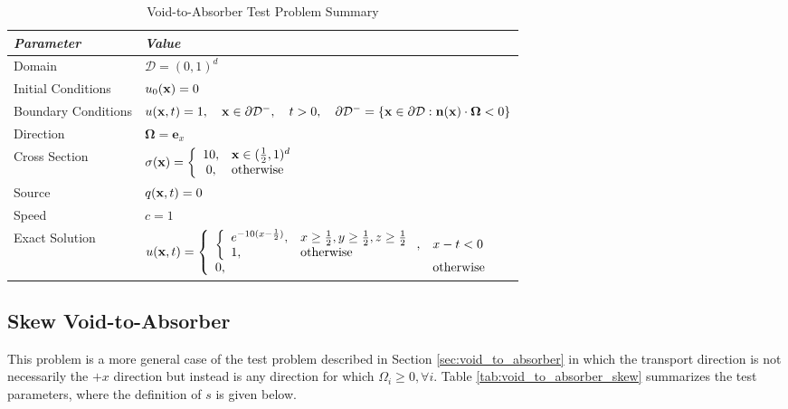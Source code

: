 \begin{table}[h]\caption{Void-to-Absorber Test Problem Summary}
\label{tab:void_to_absorber}
\centering
\begin{tabular}{l l}\toprule
\emph{Parameter} & \emph{Value}\\\midrule
Domain & $\mathcal{D} = (0,1)^d$\\
Initial Conditions & $u_0(\mathbf{x})=0$\\
Boundary Conditions & $u(\mathbf{x},t)=1,\quad \mathbf{x}\in\partial\mathcal{D}^-,\quad t>0,
   \quad\partial\mathcal{D}^-=\{\mathbf{x}\in\partial\mathcal{D}:\mathbf{n}(\mathbf{x})
   \cdot\mathbf{\Omega}<0\}$\\
Direction & $\mathbf{\Omega} = \mathbf{e}_x$\\
Cross Section & $\sigma(\mathbf{x})=\left\{\begin{array}{c l}
   10, & \mathbf{x}\in(\frac{1}{2},1)^d\\
   0,  & \mbox{otherwise}\end{array}\right.$\\
Source & $q(\mathbf{x},t)=0$\\
Speed & $c=1$\\
Exact Solution & $u(\mathbf{x},t)=\left\{\begin{array}{l l}
   \left\{\begin{array}{l l}
      e^{-10(x-\frac{1}{2})}, & x\ge\frac{1}{2}, y\ge\frac{1}{2}, z\ge\frac{1}{2}\\
      1,                      & \mbox{otherwise}
   \end{array}\right., & x-t<0\\
   0, & \mbox{otherwise}
   \end{array}\right.$ \\
\bottomrule\end{tabular}
\end{table}
\subsection{Skew Void-to-Absorber}\label{sec:skew_void_to_absorber}
This problem is a more general case of the test problem described in
Section \ref{sec:void_to_absorber} in which the transport direction is
not necessarily the $+x$ direction but instead is any direction for which
$\Omega_i\ge 0,\forall i$.
Table \ref{tab:void_to_absorber_skew} summarizes the test parameters,
where the definition of $s$ is given below.

